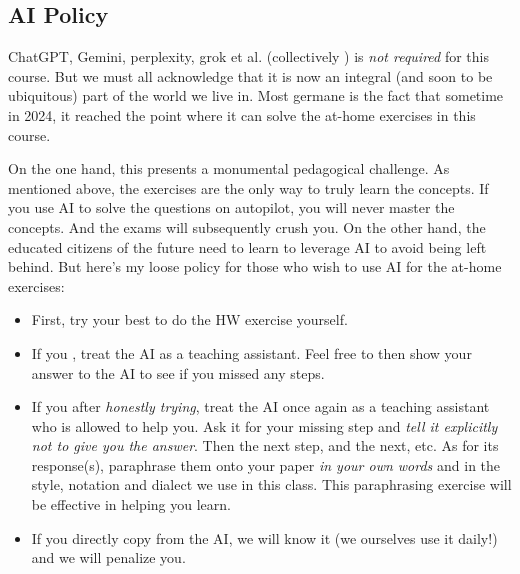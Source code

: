 \subsection*{AI Policy}

ChatGPT, Gemini, perplexity, grok et al. (collectively ) is \emph{not required} for this course. But we must all acknowledge that it is now an integral (and soon to be ubiquitous) part of the world we live in. Most germane is the fact that sometime in 2024, it reached the point where it can solve the at-home exercises in this course. 

On the one hand, this presents a monumental pedagogical challenge. As mentioned above, the exercises are the only way to truly learn the concepts. If you use AI to solve the questions on autopilot, you will never master the concepts. And the exams will subsequently crush you. On the other hand, the educated citizens of the future need to learn to leverage AI to avoid being left behind. But here's my loose policy for those who wish to use AI for the at-home exercises:

\begin{itemize}
\item First, try your best to do the HW exercise yourself. 
\item If you , treat the AI as a teaching assistant. Feel free to then show your answer to the AI to see if you missed any steps.
\item If you  after \emph{honestly trying}, treat the AI once again as a teaching assistant who is allowed to help you. Ask it for your missing step and \emph{tell it explicitly not to give you the answer}. Then the next step, and the next, etc. As for its response(s), paraphrase them onto your paper \emph{in your own words} and in the style, notation and dialect we use in this class. This paraphrasing exercise will be effective in helping you learn.
\item If you directly copy from the AI, we will know it (we ourselves use it daily!) and we will penalize you.
\end{itemize}